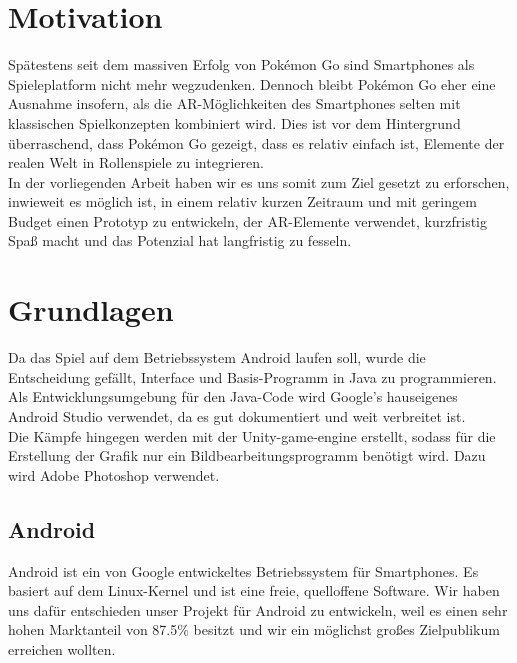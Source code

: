 \documentclass[extern,palatino]{cgBA}
\begin{document}
	\section{Motivation}
	Spätestens seit dem massiven Erfolg von Pokémon Go sind Smartphones als Spieleplatform nicht mehr wegzudenken. Dennoch bleibt Pokémon Go eher eine Ausnahme insofern, als die AR-Möglichkeiten des Smartphones selten mit klassischen Spielkonzepten kombiniert wird. Dies ist vor dem Hintergrund überraschend, dass Pokémon Go gezeigt, dass es relativ einfach ist, Elemente der realen Welt in Rollenspiele zu integrieren. \\In der vorliegenden Arbeit haben wir es uns somit zum Ziel gesetzt zu erforschen, inwieweit es möglich ist, in einem relativ kurzen Zeitraum und mit geringem Budget einen Prototyp zu entwickeln, der AR-Elemente verwendet, kurzfristig Spaß macht und das Potenzial hat langfristig zu fesseln.
	\newpage
	\section{Grundlagen}
	Da das Spiel auf dem Betriebssystem Android laufen soll, wurde die Entscheidung gefällt, Interface und Basis-Programm in Java zu programmieren. Als Entwicklungsumgebung für den Java-Code wird Google's hauseigenes Android Studio verwendet, da es gut dokumentiert und weit verbreitet ist.
	\\Die Kämpfe hingegen werden mit der Unity-game-engine erstellt, sodass für die Erstellung der Grafik nur ein Bildbearbeitungsprogramm benötigt wird. Dazu wird Adobe Photoshop verwendet.
	\subsection{Android}
	Android ist ein von Google entwickeltes Betriebssystem für Smartphones. Es basiert auf dem Linux-Kernel und ist eine freie, quelloffene Software. Wir haben uns dafür entschieden unser Projekt für Android zu entwickeln, weil es einen sehr hohen Marktanteil von 87.5\% besitzt und wir ein möglichst großes Zielpublikum erreichen wollten. 
\end{document}
